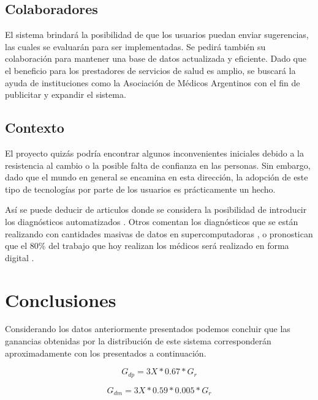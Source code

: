 \documentclass[a4paper,10pt]{article}
\begin{document}
\subsection{Colaboradores}

El sistema brindará la posibilidad de que los usuarios puedan enviar sugerencias, las cuales se evaluarán para ser implementadas. Se pedirá también su colaboración para mantener una base de datos actualizada y eficiente. 
Dado que el beneficio para los prestadores de servicios de salud es amplio, se buscará la ayuda de instituciones como la Asociación de Médicos Argentinos con el fin de publicitar y expandir el sistema.

\subsection{Contexto}

El proyecto quizás podría encontrar algunos inconvenientes iniciales debido a la resistencia al cambio o la posible falta de confianza en las personas. Sin embargo, dado que el mundo en general se encamina en esta dirección, la adopción de este  tipo de tecnologías por parte de los usuarios es prácticamente un hecho. 

Así se puede deducir de articulos donde se considera la posibilidad de introducir los diagnósticos automatizados  \cite{link9}. Otros comentan los diagnósticos que se están realizando con cantidades masivas de datos en supercomputadoras \cite{link10}, o pronostican que el $80\%$ del trabajo que hoy realizan los médicos será realizado en forma digital \cite{link11}.



\section{Conclusiones}

Considerando los datos anteriormente presentados podemos concluir que las ganancias obtenidas por la distribución de este sistema corresponderán aproximadamente con los presentados a continuación.

\begin{equation}
\label{eq:diag_personas}
G_{dp} = 3 X * 0.67 * G_r
\end{equation}

\begin{equation}
\label{eq:diag_medicos}
G_{dm} = 3 X * 0.59 * 0.005 * G_r 
\end{equation}
\end{document}
